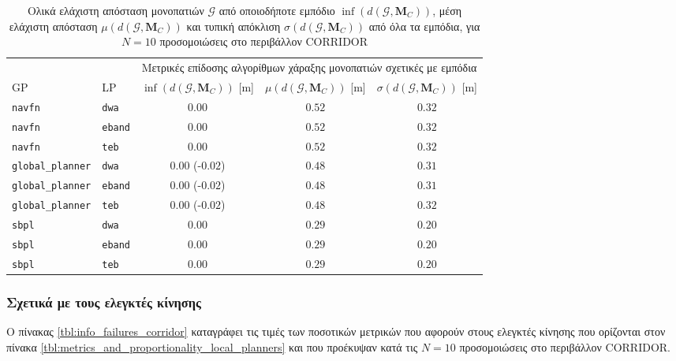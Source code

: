 \begin{table}[h]
\renewcommand{\arraystretch}{1.3}
\begin{tabular}{llccc}
  & & \multicolumn{3}{c}{Μετρικές επίδοσης αλγορίθμων χάραξης μονοπατιών σχετικές με εμπόδια} \\
  \cline{3-5}
  GP & LP & $\inf(d(\bm{\mathcal{G}},\bm{M}_C))$ [m] & $\mu(d(\bm{\mathcal{G}}, \bm{M}_C))$ [m] & $\sigma(d(\bm{\mathcal{G}},\bm{M}_C))$ [m] \\ \toprule
  \texttt{navfn} & \texttt{dwa} & $0.00$ & $0.52$ & $0.32$ \\
  \texttt{navfn} & \texttt{eband} & $0.00$ & $0.52$ & $0.32$ \\
  \texttt{navfn} & \texttt{teb} & $0.00$ & $0.52$ & $0.32$ \\
  \texttt{global\_planner} & \texttt{dwa} & \hspace{1.1cm} $0.00$ (-$0.02$) & $0.48$ & $0.31$ \\
  \texttt{global\_planner} & \texttt{eband} & \hspace{1.1cm} $0.00$ (-$0.02$) & $0.48$ & $0.31$ \\
  \texttt{global\_planner} & \texttt{teb} & \hspace{1.1cm} $0.00$ (-$0.02$) & $0.48$ & $0.32$ \\
  \texttt{sbpl} & \texttt{dwa} & $0.00$ & $0.29$ & $0.20$ \\
  \texttt{sbpl} & \texttt{eband} & $0.00$ & $0.29$ & $0.20$ \\
  \texttt{sbpl} & \texttt{teb} & $0.00$ & $0.29$ & $0.20$ \\ \bottomrule
\end{tabular}
\caption{\small Ολικά ελάχιστη απόσταση μονοπατιών $\bm{\mathcal{G}}$ από
         οποιοδήποτε εμπόδιο $\inf(d(\bm{\mathcal{G}},\bm{M}_C))$, μέση
         ελάχιστη απόσταση $\mu(d(\bm{\mathcal{G}},\bm{M}_C))$ και τυπική
         απόκλιση $\sigma(d(\bm{\mathcal{G}},\bm{M}_C))$ από όλα τα εμπόδια,
         για $N=10$ προσομοιώσεις στο περιβάλλον CORRIDOR}
\label{tbl:info_global_plan_map_corridor}
\end{table}

\subsubsection{Σχετικά με τους ελεγκτές κίνησης}

O πίνακας \ref{tbl:info_failures_corridor} καταγράφει τις τιμές των ποσοτικών
μετρικών που αφορούν στους ελεγκτές κίνησης που ορίζονται στον πίνακα
\ref{tbl:metrics_and_proportionality_local_planners} και που προέκυψαν κατά τις
$N = 10$ προσομοιώσεις στο περιβάλλον CORRIDOR.

